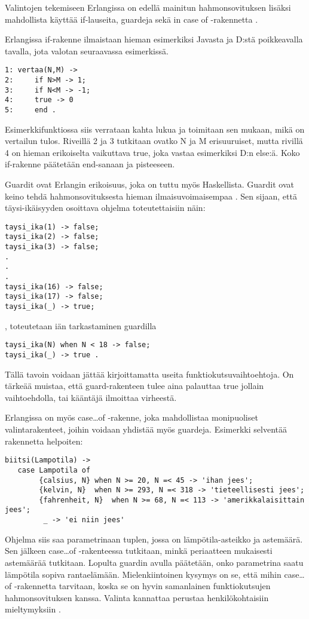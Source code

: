\documentclass[11pt,oneside,a4paper]{article}
\begin{document}
Valintojen tekemiseen Erlangissa on edellä mainitun hahmonsovituksen lisäksi mahdollista
käyttää if-lauseita, guardeja sekä in case of -rakennetta \cite{HEB13}.

Erlangissa if-rakenne ilmaistaan hieman esimerkiksi Javasta ja D:stä poikkeavalla
tavalla, jota valotan seuraavassa esimerkissä. 

\begin{verbatim}
1: vertaa(N,M) -> 
2:     if N>M -> 1;
3:     if N<M -> -1;
4:     true -> 0
5:     end . 
\end{verbatim}

Esimerkkifunktiossa siis verrataan kahta lukua ja toimitaan sen
mukaan, mikä on vertailun tulos. Riveillä 2 ja 3 tutkitaan ovatko N ja M
erisuuruiset, mutta rivillä 4 on hieman erikoiselta
vaikuttava true, joka vastaa esimerkiksi D:n else:ä. Koko if-rakenne päätetään end-sanaan ja pisteeseen. 

Guardit ovat Erlangin erikoisuus, joka on tuttu myös Haskellista. Guardit
ovat keino tehdä hahmonsovituksesta hieman ilmaisuvoimaisempaa \cite{HEB13}. Sen sijaan, että
täysi-ikäisyyden osoittava ohjelma 
toteutettaisiin näin: 
\begin{verbatim}
taysi_ika(1) -> false;
taysi_ika(2) -> false;
taysi_ika(3) -> false;
.
.
.
taysi_ika(16) -> false;
taysi_ika(17) -> false;
taysi_ika(_) -> true;
\end{verbatim}
, toteutetaan iän tarkastaminen guardilla
\begin{verbatim}
taysi_ika(N) when N < 18 -> false;
taysi_ika(_) -> true . 
\end{verbatim}

Tällä tavoin voidaan jättää kirjoittamatta useita funktiokutsuvaihtoehtoja. 
On tärkeää muistaa, että guard-rakenteen tulee aina palauttaa true jollain
vaihtoehdolla, tai kääntäjä ilmoittaa virheestä.  

Erlangissa on myös case…of -rakenne, joka mahdollistaa monipuoliset
valintarakenteet, joihin voidaan yhdistää myös guardeja. Esimerkki selventää
rakennetta helpoiten:
\begin{verbatim}
biitsi(Lampotila) -> 
   case Lampotila of
        {calsius, N} when N >= 20, N =< 45 -> 'ihan jees';
        {kelvin, N}  when N >= 293, N =< 318 -> 'tieteellisesti jees';  
        {fahrenheit, N}  when N >= 68, N =< 113 -> 'amerikkalaisittain jees'; 
         _ -> 'ei niin jees' 
\end{verbatim}

Ohjelma siis saa parametrinaan tuplen, jossa on lämpötila-asteikko ja astemäärä.
Sen jälkeen case…of -rakenteessa tutkitaan, minkä periaatteen
mukaisesti astemäärää tutkitaan. Lopulta guardin avulla päätetään, onko
parametrina saatu lämpötila sopiva rantaelämään. Mielenkiintoinen kysymys on se, että mihin
case…of -rakennetta tarvitaan, koska se on hyvin samanlainen funktiokutsujen
hahmonsovituksen kanssa. Valinta kannattaa perustaa henkilökohtaisiin
mieltymyksiin \cite{HEB13}. 
\end{document}

